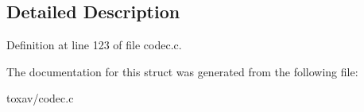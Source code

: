 \subsection{Detailed Description}


Definition at line 123 of file codec.\+c.



The documentation for this struct was generated from the following file\+:\begin{DoxyCompactItemize}
\item 
toxav/codec.\+c\end{DoxyCompactItemize}
